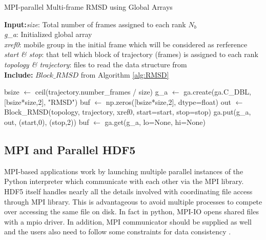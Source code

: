 \begin{algorithm}[ht!]
	\scriptsize
	\caption{MPI-parallel Multi-frame RMSD using Global Arrays}
	\label{alg:GA}
	\hspace*{\algorithmicindent} \textbf{Input:}\emph{size}: Total number of frames assigned to each rank $N_{b}$\\
	\hspace*{\algorithmicindent} \emph{g\_a}: Initialized global array \\
	\hspace*{\algorithmicindent} \emph{xref0}: mobile group in the initial frame which will be considered as rerference \\
	\hspace*{\algorithmicindent} \emph{start \& stop}: that tell which block of trajectory (frames) is assigned to each rank \\
	\hspace*{\algorithmicindent} \emph{topology \& trajectory}: files to read the data structure from \\
	\hspace*{\algorithmicindent}\textbf{Include:} $Block\_RMSD$ from Algorithm \ref{alg:RMSD}
	\begin{algorithmic}[1]
		
		\State bsize $\leftarrow$ ceil(trajectory.number\_frames / size)
		\State g\_a $\leftarrow$ ga.create(ga.C\_DBL, [bsize*size,2], "RMSD")
		\State buf $\leftarrow$ np.zeros([bsize*size,2], dtype=float)
		\State out $\leftarrow$ Block\_RMSD(topology, trajectory, xref0, start=start, stop=stop)
		\State ga.put(g\_a, out, (start,0), (stop,2))
		\State buf $\leftarrow$ ga.get(g\_a, lo=None, hi=None)
		\EndIf
	\end{algorithmic}
\end{algorithm}

\subsection{MPI and Parallel HDF5}
MPI-based applications work by launching multiple parallel instances of the Python interpreter which communicate with each other via the MPI library. 
HDF5 itself handles nearly all the details involved with coordinating file access through MPI library.
This is advantageous to avoid multiple processes to compete over accessing the same file on disk. 
In fact in python, MPI-IO opens shared files with a mpio driver. 
In addition,  MPI communicator should be supplied as well and the users also need to follow some constraints for data consistency \cite{pythonhdf5}.

